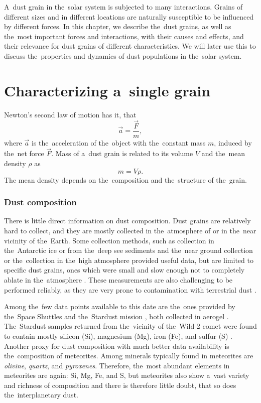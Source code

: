 A~dust grain in the~solar system is subjected to many interactions. Grains of different sizes and in different locations are naturally susceptible to be influenced by different forces. In this chapter, we describe the~dust grains, as well as the~most important forces and interactions, with their causes and effects, and their relevance for dust grains of different characteristics. We will later use this to discuss the~properties and dynamics of dust populations in the~solar system. 

\section{Characterizing a~single grain}

Newton's second law of motion has it, that
\begin{equation}
\vec{a} = \frac{\vec{F}}{m},
\end{equation}
where $\vec{a}$ is the~acceleration of the~object with the~constant mass $m$, induced by the~net force $\vec{F}$. Mass of a~dust grain is related to its volume $V$ and the~mean density $\rho$ as
\begin{equation}
    m = V \rho.
\end{equation}
The mean density depends on the~composition and the~structure of the~grain. 

\subsubsection{Dust composition}

There is little direct information on dust composition. Dust grains are relatively hard to collect, and they are mostly collected in the~atmosphere of or in the~near vicinity of the~Earth. Some collection methods, such as collection in the~Antarctic ice or from the~deep see sediments \citep{brownlee1985cosmic} and the~near ground collection \citep{pettersson1958rate} or the~collection in the~high atmosphere \citep{fechtig1968results} provided useful data, but are limited to specific dust grains, ones which were small and slow enough not to completely ablate in the~atmosphere \citep{vondrak2008chemical}. These measurements are also challenging to be performed reliably, as they are very prone to contamination with terrestrial dust \citep{taylor2016cosmic}. 

Among the~few data points available to this date are the~ones provided by the~{Space Shuttles} \citep{mcdonnell1984cosmic} and the~{Stardust} mission \citep{brownlee2014stardust}, both collected in aerogel \citep{tsou1995silica}. The~Stardust samples returned from the~vicinity of the~{Wild 2} comet were found to contain mostly silicon ({Si}), magnesium ({Mg}), iron ({Fe}), and sulfur ({S}) \citep{keller2006infrared}. Another proxy for dust composition with much better data availability is the~composition of meteorites. Among minerals typically found in meteorites are \textit{olivine}, \textit{quartz}, and \textit{pyroxenes}. Therefore, the~most abundant elements in meteorites are again: {Si}, {Mg}, {Fe}, and {S}, but meteorites also show a~vast variety and richness of composition \citep{anders1964origin} and there is therefore little doubt, that so does the~interplanetary dust. 

